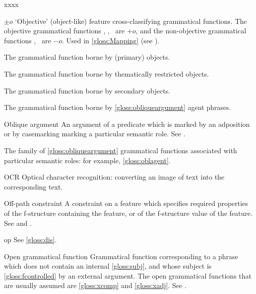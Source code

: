 \documentclass[output=paper,colorlinks,citecolor=brown]{langscibook}
\begin{document}
\begin{labeling}{xxxx}
\item[{${\pm}o$}] `Objective' (object-like) feature cross-classifying grammatical functions.  The objective grammatical functions \OBJ, , \OBJTHETA\ are $+o$, and the non-objective grammatical functions \SUBJ, \OBLTHETA\ are $-o$.  Used in \ref{gloss:Mapping} (see ).

\item[\OBJ\namedlabel{gloss:obj}{\OBJ}] The grammatical function borne by (primary) objects.

\item[\OBJTHETA\namedlabel{gloss:objtheta}{\OBJTHETA}] The grammatical function borne by thematically restricted objects.

\item[\OBJ2\namedlabel{gloss:obj2}{\OBJ2}] The grammatical function borne by secondary objects.

\item[\OBLROLE{agent}\namedlabel{gloss:oblagent}{\OBLROLE{agent}}] The grammatical function borne by \ref{gloss:obliqueargument} agent phrases.

\item[Oblique argument\namedlabel{gloss:obliqueargument}{oblique}] An argument of a predicate which is marked by an adposition or by casemarking marking a particular semantic role.  See \citetv[\ref{sect:gfs:obl}]{chapters/GFs}.

\item[\OBLTHETA\namedlabel{gloss:obltheta}{\OBLTHETA}\namedlabel{gloss:obliquetheta}{oblique}] The family of \ref{gloss:obliqueargument} grammatical functions associated with particular semantic roles: for example, \ref{gloss:oblagent}.

\item[OCR] Optical character recognition: converting an image of text into the corresponding text.

\item[Off-path constraint\namedlabel{gloss:OffPathConstraint}{off-path constraint}] A constraint on a feature which specifies required properties of the f-structure containing the feature, or of the f-structure value of the feature.  See \citetv[\ref{sect:constequ}]{chapters/CoreConcepts} and .

\item[op] See \ref{gloss:dis}.

\item[Open grammatical function\namedlabel{gloss:open}{open grammatical function}] Grammatical function corresponding to a phrase which does not contain an internal \ref{gloss:subj}, and whose subject is \ref{gloss:fcontrolled} by an external argument.  The open grammatical functions that are usually assumed are \ref{gloss:xcomp} and \ref{gloss:xadj}.  See .


\end{labeling}
\end{document}
